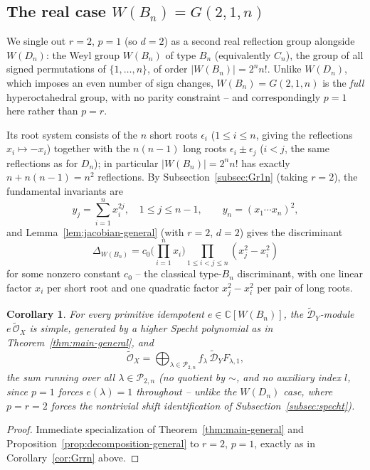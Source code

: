 \documentclass[11pt,a4paper]{article}
\newtheorem{corollary}[theorem]{Corollary}
\begin{document}
\subsection{The real case $W(B_n) = G(2,1,n)$}\label{subsec:Bn}

We single out $r=2$, $p=1$ (so $d=2$) as a second real reflection
group alongside $W(D_n)$: the Weyl group $W(B_n)$ of type $B_n$
(equivalently $C_n$), the group of all signed permutations of
$\{1,\dots,n\}$, of order $|W(B_n)| = 2^n n!$. Unlike $W(D_n)$, which
imposes an even number of sign changes, $W(B_n) = G(2,1,n)$ is the
\emph{full} hyperoctahedral group, with no parity constraint -- and
correspondingly $p=1$ here rather than $p=r$.

Its root system consists of the $n$ short roots $\epsilon_i$
($1 \le i \le n$, giving the reflections $x_i \mapsto -x_i$) together
with the $n(n-1)$ long roots $\epsilon_i \pm \epsilon_j$ ($i<j$, the
same reflections as for $D_n$); in particular
$|W(B_n)| = 2^n n!$ has exactly $n + n(n-1) = n^2$ reflections. By
Subsection~\ref{subsec:Gr1n} (taking $r=2$), the fundamental invariants
are
\[
  y_j = \sum_{i=1}^n x_i^{2j}, \quad 1 \le j \le n-1,
  \qquad
  y_n = (x_1 \cdots x_n)^2,
\]
and Lemma~\ref{lem:jacobian-general} (with $r=2$, $d=2$) gives the
discriminant
\[
  \Delta_{W(B_n)} = c_0 \Big(\prod_{i=1}^n x_i\Big) \prod_{1 \le i < j \le n} (x_j^2 - x_i^2)
\]
for some nonzero constant $c_0$ -- the classical type-$B_n$
discriminant, with one linear factor $x_i$ per short root and one
quadratic factor $x_j^2-x_i^2$ per pair of long roots.

\begin{corollary}\label{cor:Bn}
For every primitive idempotent $e \in \mathbb{C}[W(B_n)]$, the
$\widetilde{\mathcal{D}}_Y$-module $e\,\widetilde{\mathcal{O}}_X$ is
simple, generated by a higher Specht polynomial as in
Theorem~\ref{thm:main-general}, and
\[
  \widetilde{\mathcal{O}}_X = \bigoplus_{\lambda \in \mathcal{P}_{2,n}}
    f_\lambda \, \widetilde{\mathcal{D}}_Y F_{\lambda,1},
\]
the sum running over \emph{all} $\lambda \in \mathcal{P}_{2,n}$ (no
quotient by $\sim$, and no auxiliary index $l$, since $p=1$ forces
$e(\lambda)=1$ throughout -- unlike the $W(D_n)$ case, where $p=r=2$
forces the nontrivial shift identification of
Subsection~\ref{subsec:specht}).
\end{corollary}

\begin{proof}
Immediate specialization of Theorem~\ref{thm:main-general} and
Proposition~\ref{prop:decomposition-general} to $r=2$, $p=1$, exactly
as in Corollary~\ref{cor:Grrn} above.
\end{proof}
\end{document}
